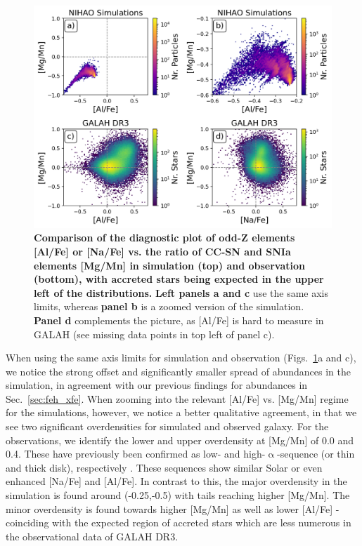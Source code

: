 \documentclass[fleqn,usenatbib]{mnras}
\begin{document}
\begin{figure}
	\includegraphics[width=\columnwidth]{figures/mgmn_alfe.png}
    \caption{
    \textbf{Comparison of the diagnostic plot of odd-Z elements [Al/Fe] or [Na/Fe] vs. the ratio of CC-SN and SNIa elements [Mg/Mn] in simulation (top) and observation (bottom), with accreted stars being expected in the upper left of the distributions.}
    \textbf{Left panels a and c} use the same axis limits, whereas \textbf{panel b} is a zoomed version of the simulation. \textbf{Panel d} complements the picture, as [Al/Fe] is hard to measure in GALAH (see missing data points in top left of panel c).
    }
    \label{fig:NaFe_MgMn_selection_Age_FeH_dissection}
\end{figure}

When using the same axis limits for simulation and observation (Figs.~\ref{fig:NaFe_MgMn_selection_Age_FeH_dissection}a and c), we notice the strong offset and significantly smaller spread of abundances in the simulation, in agreement with our previous findings for abundances in Sec.~\ref{sec:feh_xfe}. When zooming into the relevant [Al/Fe] vs. [Mg/Mn] regime for the simulations, however, we notice a better qualitative agreement, in that we see two significant overdensities for simulated and observed galaxy. For the observations, we identify the lower and upper overdensity at [Mg/Mn] of 0.0 and 0.4. These have previously been confirmed as low- and high-$\upalpha$-sequence (or thin and thick disk), respectively \citep{Hawkins2015, Buder2022}. These sequences show similar Solar or even enhanced [Na/Fe] and [Al/Fe]. In contrast to this, the major overdensity in the simulation is found around (-0.25,-0.5) with tails reaching higher [Mg/Mn]. The minor overdensity is found towards higher [Mg/Mn] as well as lower [Al/Fe] - coinciding with the expected region of accreted stars \citep{Horta2021} which are less numerous in the observational data of GALAH DR3.
\end{document}
